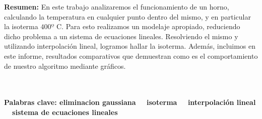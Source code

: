 \maketitle

\textbf{Resumen:}  En este trabajo analizaremos el funcionamiento de un horno, calculando la temperatura en cualquier punto dentro del mismo, y en particular la isoterma $400º$ C. Para esto realizamos un modelaje apropiado, reduciendo dicho problema a un sistema de ecuaciones lineales. Resolviendo el mismo y utilizando interpolación lineal, logramos hallar la isoterma. Además, incluimos en este informe, resultados comparativos que demuestran como es el comportamiento de nuestro algoritmo mediante gráficos.

\\
\\

\textbf{Palabras clave: eliminacion gaussiana \ \ isoterma \ \ interpolación lineal \ \ sistema de ecuaciones lineales} 
